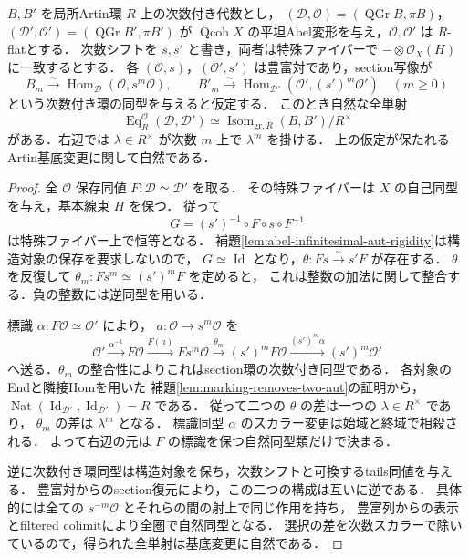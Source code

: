 \begin{proposition}[Artin局所での全構造対象付き同値]
\label{prop:artin-full-graded-recognition}
$B,B'$ を局所Artin環 $R$ 上の次数付き代数とし，
$(\mathcal D,\mathcal O)=(\operatorname{QGr}B,\pi B)$，
$(\mathcal D',\mathcal O')=(\operatorname{QGr}B',\pi B')$ が
$\operatorname{Qcoh}X$ の平坦Abel変形を与え，$\mathcal O,\mathcal O'$ は $R$-flatとする．
次数シフトを $s,s'$ と書き，両者は特殊ファイバーで
$-\otimes\mathcal O_X(H)$ に一致するとする．
各 $(\mathcal O,s)$，$(\mathcal O',s')$ は豊富対であり，section写像が
\[
 B_m\xrightarrow{\sim}\operatorname{Hom}_{\mathcal D}(\mathcal O,s^m\mathcal O),
 \qquad
 B'_m\xrightarrow{\sim}\operatorname{Hom}_{\mathcal D'}(\mathcal O',(s')^m\mathcal O')
 \quad(m\ge0)
\]
という次数付き環の同型を与えると仮定する．
このとき自然な全単射
\[
 \operatorname{Eq}^{\mathcal O}_R(\mathcal D,\mathcal D')
 \simeq\operatorname{Isom}_{\mathrm{gr},R}(B,B')/R^\times
\]
がある．右辺では $\lambda\in R^\times$ が次数 $m$ 上で $\lambda^m$ を掛ける．
上の仮定が保たれるArtin基底変更に関して自然である．
\end{proposition}
\begin{proof}
全 $\mathcal O$ 保存同値 $F:\mathcal D\simeq\mathcal D'$ を取る．
その特殊ファイバーは $X$ の自己同型を与え，基本線束 $H$ を保つ．
従って
\[
 G=(s')^{-1}\circ F\circ s\circ F^{-1}
\]
は特殊ファイバー上で恒等となる．
補題\ref{lem:abel-infinitesimal-aut-rigidity}は構造対象の保存を要求しないので，
$G\simeq\operatorname{Id}$ となり，$\theta:Fs\xrightarrow{\sim}s'F$ が存在する．
$\theta$ を反復して $\theta_m:Fs^m\simeq(s')^mF$ を定めると，
これは整数の加法に関して整合する．負の整数には逆同型を用いる．

標識 $\alpha:F\mathcal O\simeq\mathcal O'$ により，
$a:\mathcal O\to s^m\mathcal O$ を
\[
 \mathcal O'\xrightarrow{\alpha^{-1}}F\mathcal O
 \xrightarrow{F(a)}Fs^m\mathcal O
 \xrightarrow{\theta_m}(s')^mF\mathcal O
 \xrightarrow{(s')^m\alpha}(s')^m\mathcal O'
\]
へ送る．$\theta_m$ の整合性によりこれはsection環の次数付き同型である．
各対象のEndと隣接Homを用いた
補題\ref{lem:marking-removes-two-aut}の証明から，
$\operatorname{Nat}(\operatorname{Id}_{\mathcal D'},
\operatorname{Id}_{\mathcal D'})=R$ である．
従って二つの $\theta$ の差は一つの $\lambda\in R^\times$ であり，
$\theta_m$ の差は $\lambda^m$ となる．
標識同型 $\alpha$ のスカラー変更は始域と終域で相殺される．
よって右辺の元は $F$ の標識を保つ自然同型類だけで決まる．

逆に次数付き環同型は構造対象を保ち，次数シフトと可換するtails同値を与える．
豊富対からのsection復元により，この二つの構成は互いに逆である．
具体的には全ての $s^{-m}\mathcal O$ とそれらの間の射上で同じ作用を持ち，
豊富列からの表示とfiltered colimitにより全圏で自然同型となる．
選択の差を次数スカラーで除いているので，得られた全単射は基底変更に自然である．
\end{proof}

